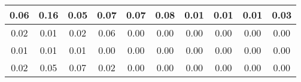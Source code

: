 \begin{tabular}{|c|c|c|c|c|c|c|c|c|c|}
\hline
0.06&0.16&0.05&0.07&0.07&0.08&0.01&0.01&0.01&0.03\\\hline
0.02&0.01&0.02&0.06&0.00&0.00&0.00&0.00&0.00&0.00\\\hline
0.01&0.01&0.01&0.00&0.00&0.00&0.00&0.00&0.00&0.00\\\hline
0.02&0.05&0.07&0.02&0.00&0.00&0.00&0.00&0.00&0.00\\\hline
\end{tabular}
